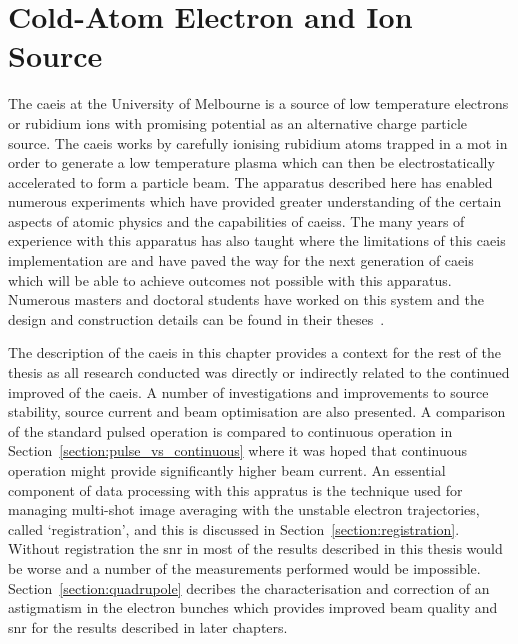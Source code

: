 \chapter{Cold-Atom Electron and Ion Source}\label{chapter:setup}

The \gls{caeis} at the University of Melbourne is a source of low temperature electrons or rubidium ions with promising potential as an alternative charge particle source.
The \gls{caeis} works by carefully ionising rubidium atoms trapped in a \gls{mot} in order to generate a low temperature plasma which can then be electrostatically accelerated to form a particle beam.
The apparatus described here has enabled numerous experiments which have provided greater understanding of the certain aspects of atomic physics and the capabilities of \glspl{caeis}.
The many years of experience with this apparatus has also taught where the limitations of this \gls{caeis} implementation are and have paved the way for the next generation of \gls{caeis} which will be able to achieve outcomes not possible with this apparatus.
Numerous masters and doctoral students have worked on this system and the design and construction details can be found in their theses~\cite{sheludko_shaped_2010,bell_cold_2011,saliba_cold_2011,mcculloch_generation_2013,taylor_rydberg_2013,tielen_development_2015,murphy_measurement_2017,speirs_electron_2017}.

The description of the \gls{caeis} in this chapter provides a context for the rest of the thesis as all research conducted was directly or indirectly related to the continued improved of the \gls{caeis}. A number of investigations and improvements to source stability, source current and beam optimisation are also presented.
A comparison of the standard pulsed operation is compared to continuous operation in Section~\ref{section:pulse_vs_continuous} where it was hoped that continuous operation might provide significantly higher beam current.
An essential component of data processing with this appratus is the technique used for managing multi-shot image averaging with the unstable electron trajectories, called `registration', and this is discussed in Section~\ref{section:registration}.
Without registration the \gls{snr} in most of the results described in this thesis would be worse and a number of the measurements performed would be impossible.
Section~\ref{section:quadrupole} decribes the characterisation and correction of an astigmatism in the electron bunches which provides improved beam quality and \gls{snr} for the results described in later chapters.


